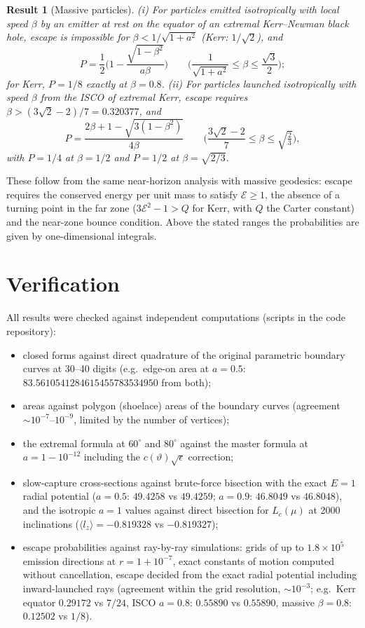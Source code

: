 \documentclass[11pt,a4paper]{article}
\newtheorem{result}{Result}
\theoremstyle{remark}
\numberwithin{equation}{section}
\begin{document}
\begin{result}[Massive particles]\label{res:massive}
(i) For particles emitted isotropically with local speed $\beta$ by an emitter at rest on the equator of an extremal
Kerr--Newman black hole, escape is impossible for $\beta<1/\sqrt{1+a^2}$ (Kerr: $1/\sqrt2$), and
\begin{equation}
P=\frac12\Big(1-\frac{\sqrt{1-\beta^2}}{a\beta}\Big)\qquad\Big(\frac{1}{\sqrt{1+a^2}}\le\beta\le\frac{\sqrt3}{2}\Big);
\end{equation}
for Kerr, $P=1/8$ exactly at $\beta=0.8$. (ii) For particles launched isotropically with speed $\beta$ from the ISCO of
extremal Kerr, escape requires $\beta>(3\sqrt2-2)/7=0.320377$, and
\begin{equation}
P=\frac{2\beta+1-\sqrt{3(1-\beta^2)}}{4\beta}\qquad\Big(\frac{3\sqrt2-2}{7}\le\beta\le\sqrt{\tfrac23}\Big),
\end{equation}
with $P=1/4$ at $\beta=1/2$ and $P=1/2$ at $\beta=\sqrt{2/3}$.
\end{result}
These follow from the same near-horizon analysis with massive geodesics: escape requires the conserved energy per unit mass to satisfy $\mathcal E\ge1$, the absence of a
turning point in the far zone ($3\mathcal E^2-1>Q$ for Kerr, with $Q$ the Carter constant) and the near-zone bounce condition. Above the stated ranges the
probabilities are given by one-dimensional integrals.

\section{Verification}\label{sec:verify}
All results were checked against independent computations (scripts in the code repository):
\begin{itemize}
\item closed forms against direct quadrature of the original parametric boundary curves at 30--40 digits
(e.g.\ edge-on area at $a=0.5$: $83.5610541284615455783534950$ from both);
\item areas against polygon (shoelace) areas of the boundary curves (agreement $\sim10^{-7}$--$10^{-9}$, limited by
the number of vertices);
\item the extremal formula at $60^\circ$ and $80^\circ$ against the master formula at $a=1-10^{-12}$ including the
$c(\vartheta)\sqrt\epsilon$ correction;
\item slow-capture cross-sections against brute-force bisection with the exact $E=1$ radial potential
($a=0.5$: $49.4258$ vs $49.4259$; $a=0.9$: $46.8049$ vs $46.8048$), and the isotropic $a=1$ values against direct bisection
for $L_c(\mu)$ at 2000 inclinations ($\langle l_z\rangle=-0.819328$ vs $-0.819327$);
\item escape probabilities against ray-by-ray simulations: grids of up to $1.8\times10^5$ emission directions at
$r=1+10^{-7}$, exact constants of motion computed without cancellation, escape decided from the exact radial potential
including inward-launched rays (agreement within the grid resolution, $\sim10^{-3}$; e.g.\ Kerr equator $0.29172$
vs $7/24$, ISCO $a=0.8$: $0.55890$ vs $0.55890$, massive $\beta=0.8$: $0.12502$ vs $1/8$).
\end{itemize}
\end{document}
